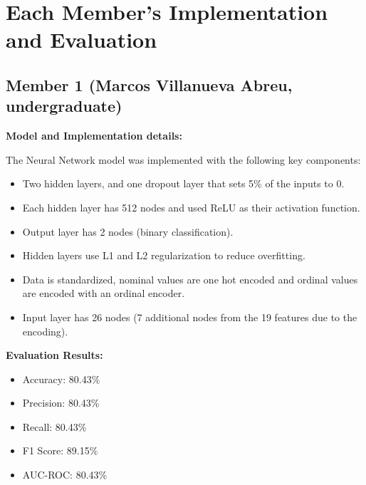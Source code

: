 \documentclass[11pt,a4paper]{article}
\begin{document}

\section{Each Member's Implementation and Evaluation}

\subsection{Member 1 (Marcos Villanueva Abreu, undergraduate)}

\begin{tcolorbox}[
        title=Neural Network Implementation,
        colback=lightblue!30,
        colframe=darkblue,
        boxrule=0.5pt,
        fonttitle=\bfseries\sffamily\footnotesize,
        fontupper=\footnotesize
    ]
    \textbf{Model and Implementation details:}

    The Neural Network model was implemented with the following key components:
    \begin{itemize}[leftmargin=*, itemsep=2pt, parsep=0pt]
        \item Two hidden layers, and one dropout layer that sets 5\% of the inputs to 0.
        \item Each hidden layer has 512 nodes and used ReLU as their activation function.
        \item Output layer has 2 nodes (binary classification).
        \item Hidden layers use L1 and L2 regularization to reduce overfitting.
        \item Data is standardized, nominal values are one hot encoded and ordinal values are encoded with an ordinal encoder.
        \item Input layer has 26 nodes (7 additional nodes from the 19 features due to the encoding).
    \end{itemize}

    \textbf{Evaluation Results:}
    \begin{itemize}[leftmargin=*, itemsep=2pt, parsep=0pt]
        \item Accuracy: 80.43\%
        \item Precision: 80.43\%
        \item Recall: 80.43\%
        \item F1 Score: 89.15\%
        \item AUC-ROC: 80.43\%
    \end{itemize}
\end{tcolorbox}
\end{document}
